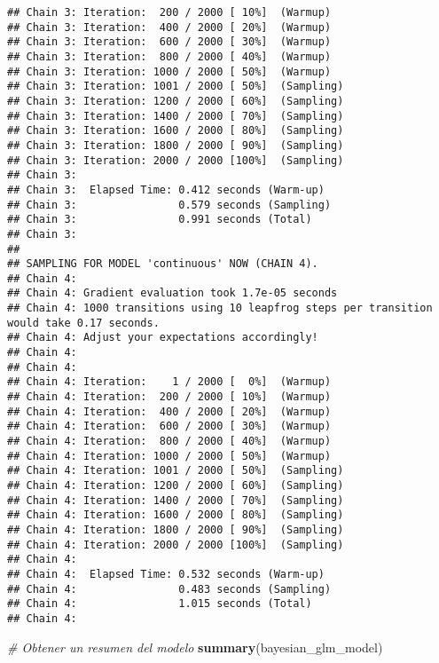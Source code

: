 \documentclass[
]{article}
\newenvironment{Shaded}{\begin{snugshade}}{\end{snugshade}}
\newcommand{\CommentTok}[1]{\textcolor[rgb]{0.56,0.35,0.01}{\textit{#1}}}
\newcommand{\FunctionTok}[1]{\textcolor[rgb]{0.13,0.29,0.53}{\textbf{#1}}}
\newcommand{\NormalTok}[1]{#1}
\begin{document}
\begin{verbatim}
## Chain 3: Iteration:  200 / 2000 [ 10%]  (Warmup)
## Chain 3: Iteration:  400 / 2000 [ 20%]  (Warmup)
## Chain 3: Iteration:  600 / 2000 [ 30%]  (Warmup)
## Chain 3: Iteration:  800 / 2000 [ 40%]  (Warmup)
## Chain 3: Iteration: 1000 / 2000 [ 50%]  (Warmup)
## Chain 3: Iteration: 1001 / 2000 [ 50%]  (Sampling)
## Chain 3: Iteration: 1200 / 2000 [ 60%]  (Sampling)
## Chain 3: Iteration: 1400 / 2000 [ 70%]  (Sampling)
## Chain 3: Iteration: 1600 / 2000 [ 80%]  (Sampling)
## Chain 3: Iteration: 1800 / 2000 [ 90%]  (Sampling)
## Chain 3: Iteration: 2000 / 2000 [100%]  (Sampling)
## Chain 3: 
## Chain 3:  Elapsed Time: 0.412 seconds (Warm-up)
## Chain 3:                0.579 seconds (Sampling)
## Chain 3:                0.991 seconds (Total)
## Chain 3: 
## 
## SAMPLING FOR MODEL 'continuous' NOW (CHAIN 4).
## Chain 4: 
## Chain 4: Gradient evaluation took 1.7e-05 seconds
## Chain 4: 1000 transitions using 10 leapfrog steps per transition would take 0.17 seconds.
## Chain 4: Adjust your expectations accordingly!
## Chain 4: 
## Chain 4: 
## Chain 4: Iteration:    1 / 2000 [  0%]  (Warmup)
## Chain 4: Iteration:  200 / 2000 [ 10%]  (Warmup)
## Chain 4: Iteration:  400 / 2000 [ 20%]  (Warmup)
## Chain 4: Iteration:  600 / 2000 [ 30%]  (Warmup)
## Chain 4: Iteration:  800 / 2000 [ 40%]  (Warmup)
## Chain 4: Iteration: 1000 / 2000 [ 50%]  (Warmup)
## Chain 4: Iteration: 1001 / 2000 [ 50%]  (Sampling)
## Chain 4: Iteration: 1200 / 2000 [ 60%]  (Sampling)
## Chain 4: Iteration: 1400 / 2000 [ 70%]  (Sampling)
## Chain 4: Iteration: 1600 / 2000 [ 80%]  (Sampling)
## Chain 4: Iteration: 1800 / 2000 [ 90%]  (Sampling)
## Chain 4: Iteration: 2000 / 2000 [100%]  (Sampling)
## Chain 4: 
## Chain 4:  Elapsed Time: 0.532 seconds (Warm-up)
## Chain 4:                0.483 seconds (Sampling)
## Chain 4:                1.015 seconds (Total)
## Chain 4:
\end{verbatim}

\begin{Shaded}
\begin{Highlighting}[]
\CommentTok{\# Obtener un resumen del modelo}
\FunctionTok{summary}\NormalTok{(bayesian\_glm\_model)}
\end{Highlighting}
\end{Shaded}
\end{document}
